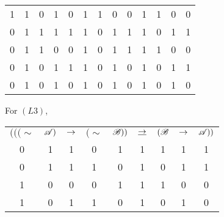 \begin{enumerate}
\begin{center}
\begin{tabular}{ccccccccccccc}
        1& %
        1& %
        0& %
        1& %
        0& %
        1&
        1& %
        0& %
        0& %
        1& %
        1& %
        0& %
        0\\%

        0& %
        1& %
        1& %
        1& %
        1& %
        1&
        0& %
        1& %
        1& %
        1& %
        0& %
        1& %
        1\\%

        0& %
        1& %
        1& %
        0& %
        0& %
        1&
        0& %
        1& %
        1& %
        1& %
        1& %
        0& %
        0\\%

        0& %
        1& %
        0& %
        1& %
        1& %
        1&
        0& %
        1& %
        0& %
        1& %
        0& %
        1& %
        1\\%

        0& %
        1& %
        0& %
        1& %
        0& %
        1&
        0& %
        1& %
        0& %
        1& %
        0& %
        1& %
        0%
      \end{tabular}
    \end{center}

    For \((L3)\),
    \begin{center}
      \begin{tabular}{ccccccccc}
        \((((\sim\)&
        \(\mathscr{A})\)&
        \(\rightarrow\)&
        \((\sim\)&
        \(\mathscr{B}))\)&
        \(\underline{\rightarrow}\)&
        \((\mathscr{B}\)&
        \(\rightarrow\)&
        \(\mathscr{A}))\)\\

        0& %
        1& %
        1& %
        0& %
        1& %
        1& %
        1& %
        1& %
        1\\%

        0& %
        1& %
        1& %
        1& %
        0& %
        1& %
        0& %
        1& %
        1\\%

        1& %
        0& %
        0& %
        0& %
        1& %
        1& %
        1& %
        0& %
        0\\%

        1& %
        0& %
        1& %
        1& %
        0& %
        1& %
        0& %
        1& %
        0%
      \end{tabular}
    \end{center}


\end{enumerate}
